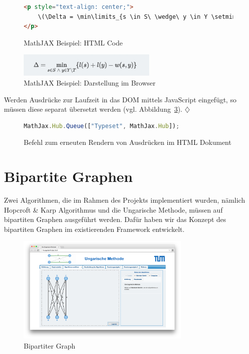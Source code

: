 \begin{figure}[h!]
\begin{lstlisting}[language=HTML]
<p style="text-align: center;">
	\(\Delta = \min\limits_{s \in S\ \wedge\ y \in Y \setminus T}\{l(s) + l(y) - w(s,y)\}\)
</p>
\end{lstlisting}
\caption[MathJAX: Beispiel Code]{MathJAX Beispiel: HTML Code}\label{fig:listing-mathjax-example-html}
\end{figure}

\begin{figure}[h!]
	\centering
	\includegraphics[width=0.6\textwidth]{figures/mathjax-example}
	\caption[MathJAX: Beispiel im Browser]{MathJAX Beispiel: Darstellung im Browser}\label{fig:mathjax-example-img}
\end{figure}

Werden Ausdrücke zur Laufzeit in das DOM mittels JavaScript eingefügt, so müssen diese separat übersetzt werden (vgl. Abbildung~\ref{fig:listing-mathjax-render}). \hfill$\diamondsuit$

\begin{figure}[h!]
\begin{lstlisting}[language=JavaScript]
MathJax.Hub.Queue(["Typeset", MathJax.Hub]);
\end{lstlisting}
\caption[MathJAX: Render Befehl]{Befehl zum erneuten Rendern von Ausdrücken im HTML Dokument}\label{fig:listing-mathjax-render}
\end{figure}

\section{Bipartite Graphen} %
Zwei Algorithmen, die im Rahmen des Projekts implementiert wurden, nämlich Hopcroft \& Karp Algorithmus und die Ungarische Methode, müssen auf bipartiten Graphen ausgeführt werden. Dafür haben wir das Konzept des bipartiten Graphen im existierenden Framework entwickelt. 

\begin{figure}[h!]
	\centering
	\includegraphics[width=0.75\textwidth]{figures/hungarian-bipartite}
	\caption[Bipartiter Graph]{Bipartiter Graph}\label{fig:hungarian-bipartite}
\end{figure}

